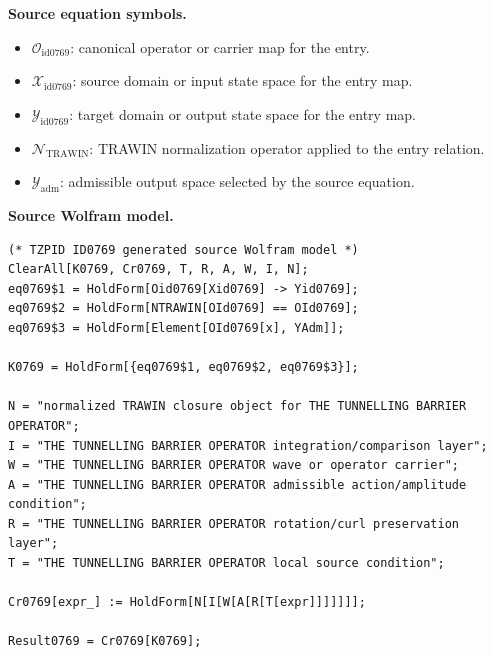 \begin{minipage}[t]{0.49\linewidth}
\begingroup
\small
\raggedright
\textbf{Source equation symbols.}\par
\begin{itemize}[leftmargin=1.35em,itemsep=1pt,topsep=1pt,parsep=0pt]
    \item $\mathcal{O}_{\mathrm{id0769}}$: canonical operator or carrier map for the entry.
    \item $\mathcal{X}_{\mathrm{id0769}}$: source domain or input state space for the entry map.
    \item $\mathcal{Y}_{\mathrm{id0769}}$: target domain or output state space for the entry map.
    \item $\mathcal{N}_{\mathrm{TRAWIN}}$: TRAWIN normalization operator applied to the entry relation.
    \item $\mathcal{Y}_{\mathrm{adm}}$: admissible output space selected by the source equation.
\end{itemize}
\endgroup
\end{minipage}\hfill
\begin{minipage}[t]{0.47\linewidth}
\begingroup
\scriptsize
\raggedright
\textbf{Source Wolfram model.}\par
\begin{Verbatim}[fontsize=\tiny,breaklines=true,breakanywhere=true]
(* TZPID ID0769 generated source Wolfram model *)
ClearAll[K0769, Cr0769, T, R, A, W, I, N];
eq0769$1 = HoldForm[Oid0769[Xid0769] -> Yid0769];
eq0769$2 = HoldForm[NTRAWIN[OId0769] == OId0769];
eq0769$3 = HoldForm[Element[OId0769[x], YAdm]];

K0769 = HoldForm[{eq0769$1, eq0769$2, eq0769$3}];

N = "normalized TRAWIN closure object for THE TUNNELLING BARRIER OPERATOR";
I = "THE TUNNELLING BARRIER OPERATOR integration/comparison layer";
W = "THE TUNNELLING BARRIER OPERATOR wave or operator carrier";
A = "THE TUNNELLING BARRIER OPERATOR admissible action/amplitude condition";
R = "THE TUNNELLING BARRIER OPERATOR rotation/curl preservation layer";
T = "THE TUNNELLING BARRIER OPERATOR local source condition";

Cr0769[expr_] := HoldForm[N[I[W[A[R[T[expr]]]]]]];

Result0769 = Cr0769[K0769];
\end{Verbatim}
\endgroup
\end{minipage}

